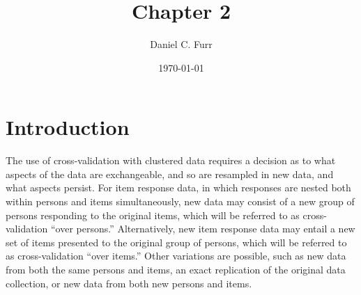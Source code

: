 \documentclass[12pt, letterpaper]{article}
\title{Chapter 2}
\author{Daniel C. Furr}
\date{\today}
\begin{document}

\newcommand{\comment}[1]{{\footnotesize[\textit{#1}]}}

\maketitle

\tableofcontents
\newpage
{\footnotesize }


\section{Introduction}


The use of cross-validation with clustered data requires a decision as to what aspects of the data are exchangeable, and so are resampled in new data, and what aspects persist. For item response data, in which responses are nested both within persons and items simultaneously, new data may consist of a new group of persons responding to the original items, which will be referred to as cross-validation ``over persons.'' Alternatively, new item response data may entail a new set of items presented to the original group of persons, which will be referred to as cross-validation ``over items.'' Other variations are possible, such as new data from both the same persons and items, an exact replication of the original data collection, or new data from both new persons and items.
\end{document}
